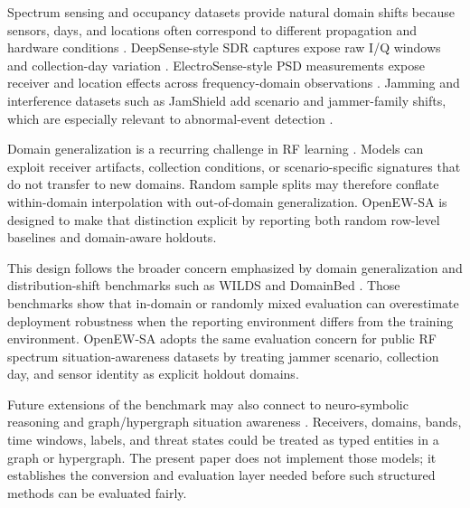 \documentclass{ieeeaccess}
\begin{document}
Spectrum sensing and occupancy datasets provide natural domain shifts because sensors, days, and locations often correspond to different propagation and hardware conditions \cite{uvaydov2021deepsense,rajendran2017electrosenseOpenBig}. DeepSense-style SDR captures expose raw I/Q windows and collection-day variation \cite{uvaydov2021deepsense,wiotlab2021deepsenseGithub}. ElectroSense-style PSD measurements expose receiver and location effects across frequency-domain observations \cite{scalingi2023wirelessTechnologyClassification,scalingi2023electrosensePsdDataset,rajendran2017electrosenseOpenBig}. Jamming and interference datasets such as JamShield add scenario and jammer-family shifts, which are especially relevant to abnormal-event detection \cite{panitsas2025jamshield,panitsas2024jamshieldDatasetGithub,panitsas2024jamshieldDatasetDataport}.

Domain generalization is a recurring challenge in RF learning \cite{zhang2025domainGeneralizationRff}. Models can exploit receiver artifacts, collection conditions, or scenario-specific signatures that do not transfer to new domains. Random sample splits may therefore conflate within-domain interpolation with out-of-domain generalization. OpenEW-SA is designed to make that distinction explicit by reporting both random row-level baselines and domain-aware holdouts.

This design follows the broader concern emphasized by domain generalization and distribution-shift benchmarks such as WILDS and DomainBed \cite{koh2021wilds,gulrajani2021domainbed}. Those benchmarks show that in-domain or randomly mixed evaluation can overestimate deployment robustness when the reporting environment differs from the training environment. OpenEW-SA adopts the same evaluation concern for public RF spectrum situation-awareness datasets by treating jammer scenario, collection day, and sensor identity as explicit holdout domains.

Future extensions of the benchmark may also connect to neuro-symbolic reasoning \cite{cheng2024neuralSymbolicKgSurvey,liu2025neuralSymbolicQuerySurvey,delong2023neurosymbolicAiKgSurvey} and graph/hypergraph situation awareness \cite{gao2024hypergraphSituationAwareness,alavizadeh2022cyberSituationAwarenessSurvey}. Receivers, domains, bands, time windows, labels, and threat states could be treated as typed entities in a graph or hypergraph. The present paper does not implement those models; it establishes the conversion and evaluation layer needed before such structured methods can be evaluated fairly.
\end{document}
